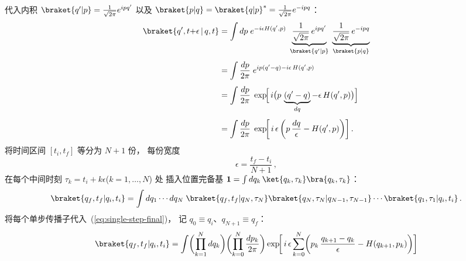 \medskip\noindent
代入内积 $\braket{q'|p}=\frac{1}{\sqrt{2\pi}}e^{ipq'}$
以及
$\braket{p|q}=\braket{q|p}^*=\frac{1}{\sqrt{2\pi}}e^{-ipq}$：
\begin{align}
  \braket{q',t{+}\epsilon\,|\,q,t}
  &=\int dp\;e^{-i\epsilon H(q',p)}\;
    \underbrace{\frac{1}{\sqrt{2\pi}}\,e^{ipq'}}_{%
      \braket{q'|p}}\;
    \underbrace{\frac{1}{\sqrt{2\pi}}\,e^{-ipq}}_{%
      \braket{p|q}}
    \notag\\[4pt]
  &=\int\frac{dp}{2\pi}\;
    e^{ip(q'-q)-i\epsilon\,H(q',p)}
    \notag\\[4pt]
  &=\int\frac{dp}{2\pi}\;
    \exp\!\Bigl[\,
      i\bigl(p\,\underbrace{(q'-q)}_{dq}
      -\epsilon\,H(q',p)\bigr)
    \Bigr]
    \notag\\[4pt]
  &=\int\frac{dp}{2\pi}\;
    \exp\!\biggl[\,
      i\,\epsilon\,\biggl(
        p\,\frac{dq}{\epsilon}-H(q',p)
      \biggr)
    \biggr]\,.
    \label{eq:single-step-final}
\end{align}
将时间区间 $[t_i,t_f]$ 等分为 $N{+}1$ 份，
每份宽度
\begin{equation}
  \epsilon=\frac{t_f-t_i}{N+1}\,,
\end{equation}
在每个中间时刻 $\tau_k=t_i+k\epsilon$\;($k=1,\dots,N$) 处
插入位置完备基
$\mathbf{1}=\int dq_k\,\ket{q_k,\tau_k}\bra{q_k,\tau_k}$：
\begin{equation}\label{eq:propagator-sliced}
  \braket{q_f,t_f|q_i,t_i}
  =\int dq_1\cdots dq_N\;
    \braket{q_f,t_f|q_N,\tau_N}
    \braket{q_N,\tau_N|q_{N-1},\tau_{N-1}}
    \cdots
    \braket{q_1,\tau_1|q_i,t_i}\,.
\end{equation}
将每个单步传播子代入~(\ref{eq:single-step-final})，
记 $q_0\equiv q_i$、$q_{N+1}\equiv q_f$：
\begin{equation}\label{eq:PI-discrete}
  \braket{q_f,t_f|q_i,t_i}
  =\int\biggl(\prod_{k=1}^{N}dq_k\biggr)
    \biggl(\prod_{k=0}^{N}\frac{dp_k}{2\pi}\biggr)
  \exp\!\biggl[\,
    i\,\epsilon\sum_{k=0}^{N}\biggl(
      p_k\,\frac{q_{k+1}-q_k}{\epsilon}
      -H(q_{k+1},p_k)
    \biggr)
  \biggr]
\end{equation}

